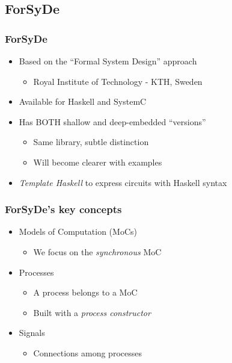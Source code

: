 \documentclass{beamer}
\begin{document}
        \subsection{ForSyDe}
        \label{subsec:forsyde}
            \begin{frame}
                \frametitle{ForSyDe}

                \begin{itemize}
                    \item Based on the ``Formal System Design'' approach
                        \begin{itemize}
                            \item Royal Institute of Technology - KTH, Sweden
                        \end{itemize}
                    \item Available for Haskell and SystemC
                    \item Has BOTH shallow and deep-embedded ``versions''
                        \begin{itemize}
                            \item Same library, subtle distinction
                            \item Will become clearer with examples
                        \end{itemize}
                    \item \emph{Template Haskell} to express circuits with Haskell syntax
                \end{itemize}
            \end{frame}

            \begin{frame}
                \frametitle{ForSyDe's key concepts}

                \begin{itemize}
                    \item Models of Computation (MoCs)
                        \begin{itemize}
                            \item We focus on the \emph{synchronous} MoC
                        \end{itemize}
                    \item Processes
                        \begin{itemize}
                            \item A process belongs to a MoC
                            \item Built with a \emph{process constructor}
                        \end{itemize}
                    \item Signals
                        \begin{itemize}
                            \item Connections among processes
                        \end{itemize}
                \end{itemize}
            \end{frame}
\end{document}
